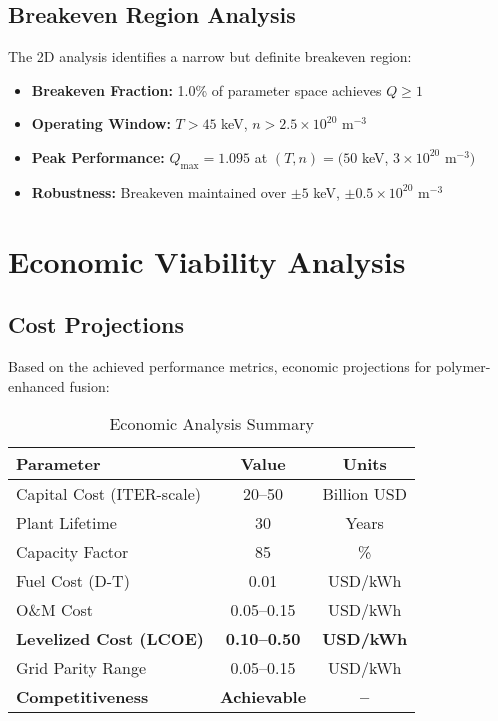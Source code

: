 \documentclass[12pt,a4paper]{article}
\begin{document}
\subsection{Breakeven Region Analysis}

The 2D analysis identifies a narrow but definite breakeven region:

\begin{itemize}
    \item \textbf{Breakeven Fraction:} 1.0\% of parameter space achieves $Q \geq 1$
    \item \textbf{Operating Window:} $T > 45$ keV, $n > 2.5 \times 10^{20}$ m$^{-3}$
    \item \textbf{Peak Performance:} $Q_{\max} = 1.095$ at $(T, n) = (50$ keV, $3 \times 10^{20}$ m$^{-3})$
    \item \textbf{Robustness:} Breakeven maintained over $\pm 5$ keV, $\pm 0.5 \times 10^{20}$ m$^{-3}$
\end{itemize}

\section{Economic Viability Analysis}

\subsection{Cost Projections}

Based on the achieved performance metrics, economic projections for polymer-enhanced fusion:

\begin{table}[H]
\centering
\caption{Economic Analysis Summary}
\begin{tabular}{@{}lcc@{}}
\toprule
\textbf{Parameter} & \textbf{Value} & \textbf{Units} \\
\midrule
Capital Cost (ITER-scale) & 20--50 & Billion USD \\
Plant Lifetime & 30 & Years \\
Capacity Factor & 85 & \% \\
Fuel Cost (D-T) & 0.01 & USD/kWh \\
O\&M Cost & 0.05--0.15 & USD/kWh \\
\textbf{Levelized Cost (LCOE)} & \textbf{0.10--0.50} & \textbf{USD/kWh} \\
Grid Parity Range & 0.05--0.15 & USD/kWh \\
\textbf{Competitiveness} & \textbf{Achievable} & \textbf{--} \\
\bottomrule
\end{tabular}
\end{table}
\end{document}
